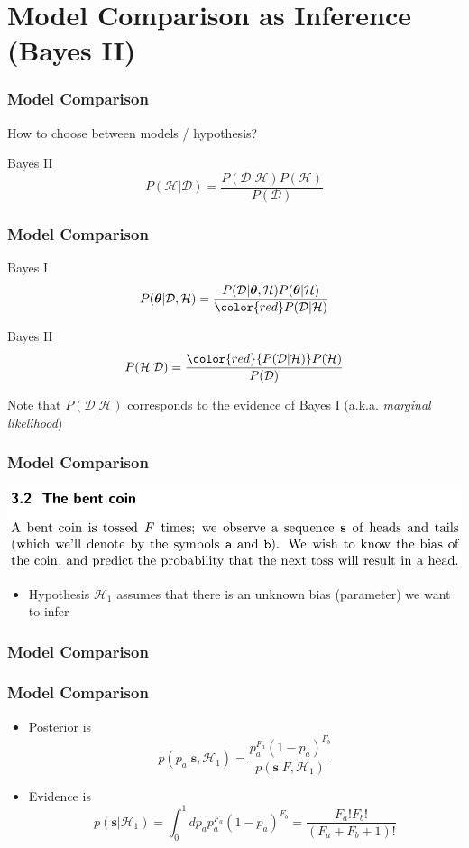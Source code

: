 \documentclass{beamer}
\begin{document}
\section{Model Comparison as Inference (Bayes II)}


\begin{frame}
	\frametitle{Model Comparison}
	How to choose between models / hypothesis?
	\begin{block}{Bayes II}
$$ P( \mathcal{H}| \mathcal{D}) = \frac{P(\mathcal{D}|\mathcal{H})P(\mathcal{H})}  {P(\mathcal{D})}$$
	\end{block}
\end{frame}


\begin{frame}
	\frametitle{Model Comparison}
\begin{block}{Bayes I}
$$ P(\boldsymbol{\theta}| \mathcal{D}, \mathcal{H}) = \frac{P(\mathcal{D}|\boldsymbol{\theta}, \mathcal{H})P(\boldsymbol{\theta}|\mathcal{H})}{{\color{red}P(\mathcal{D}|\mathcal{H})}}$$
\end{block}
	\begin{block}{Bayes II}
$$ P( \mathcal{H}| \mathcal{D}) = \frac{{\color{red}{P(\mathcal{D}|\mathcal{H})}}P(\mathcal{H})}  {P(\mathcal{D})}$$
	\end{block}
	Note that $P(\mathcal{D}|\mathcal{H})$ corresponds to the evidence of Bayes I (a.k.a. \emph{marginal likelihood})
\end{frame}



\begin{frame}
	\frametitle{Model Comparison}
   \includegraphics[width=.8\textwidth]{e14}\\
\begin{itemize}
	\item Hypothesis $\mathcal{H}_1$ assumes that there is an unknown bias (parameter) we want to infer
\end{itemize}
\end{frame}


\begin{frame}
	\frametitle{Model Comparison}
\end{frame}

\begin{frame}
	\frametitle{Model Comparison}
\begin{itemize}
\item Posterior is
	$$p(p_a | \mathbf{s}, \mathcal{H}_1) = \frac{p_a^{F_a} (1-p_a)^{F_b}}{p(\mathbf{s}|F,\mathcal{H}_1)} $$
\item Evidence is
	$$p(\mathbf{s} | \mathcal{H}_1) = \int_0^1 dp_a p_a^{F_a} (1-p_a)^{F_b} =\frac{F_a!F_b!}{(F_a+F_b+1)!} $$
\end{itemize}
\end{frame}
\end{document}
